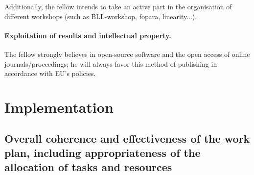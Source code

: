 \documentclass{article}[11pt]
\begin{document}
Additionally, the fellow intends to take an active part in the organisation of different workshops (such as BLL-workshop, fopara, linearity...).

\paragraph{Exploitation of results and intellectual property.}
The fellow strongly believes in open-source software and the open access of online journals/proceedings; he will always favor this method of publishing in accordance with EU’s policies. 





\section{Implementation}
\subsection{Overall coherence and effectiveness of the work plan, including appropriateness of the allocation of tasks and resources}
\end{document}
